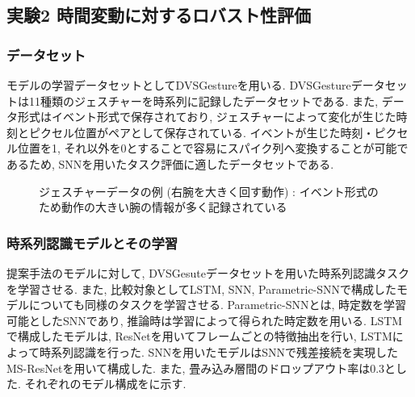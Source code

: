 \makeatletter %
\subsection{実験2 時間変動に対するロバスト性評価}

\subsubsection{データセット}
モデルの学習データセットとしてDVSGesture\cite{dvsgesture}を用いる.
DVSGestureデータセットは11種類のジェスチャーを時系列に記録したデータセットである.
また, データ形式はイベント形式で保存されており, ジェスチャーによって変化が生じた時刻とピクセル位置がペアとして保存されている.
イベントが生じた時刻・ピクセル位置を1, それ以外を0とすることで容易にスパイク列へ変換することが可能であるため, SNNを用いたタスク評価に適したデータセットである\cite{9207109}.

\begin{figure*}[t]
    \centering
    \parbox{.9\linewidth}{
        \centering
        
        \caption{ジェスチャーデータの例 (右腕を大きく回す動作) : イベント形式のため動作の大きい腕の情報が多く記録されている}
        \label{sec3:fig:gesture}
    }

\end{figure*}

\subsubsection{時系列認識モデルとその学習}
提案手法のモデルに対して, DVSGesuteデータセットを用いた時系列認識タスクを学習させる.
また, 比較対象としてLSTM, SNN, Parametric-SNN\cite{ParametricSNN}で構成したモデルについても同様のタスクを学習させる.
Parametric-SNNとは, 時定数を学習可能としたSNNであり, 推論時は学習によって得られた時定数を用いる.
LSTMで構成したモデルは, ResNet\cite{ResNet}を用いてフレームごとの特徴抽出を行い, LSTMによって時系列認識を行った\cite{CNNLSTM}.
SNNを用いたモデルはSNNで残差接続を実現したMS-ResNet\cite{MSResNet}を用いて構成した.
また, 畳み込み層間のドロップアウト率は0.3とした.
それぞれのモデル構成をに示す.

